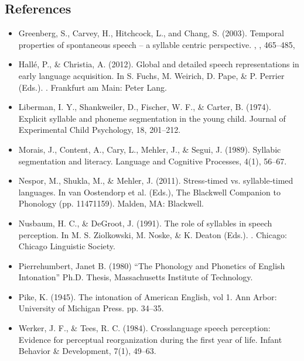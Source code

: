 \documentclass[letterpaper,10pt,english]{jupyterBook}
\begin{document}
\subsection{References}
\label{\detokenize{Introduction/Linguistic_structure_of_speech:references}}\begin{itemize}
\item {} 
\sphinxAtStartPar
Greenberg, S., Carvey, H., Hitchcock, L., and Chang, S. (2003). Temporal properties of spontaneous speech – a syllable centric perspective. , , 465–485,

\item {} 
\sphinxAtStartPar
Hallé, P., \& Christia, A. (2012). Global and detailed speech representations in early language acquisition. In S. Fuchs, M. Weirich, D. Pape, \& P. Perrier (Eds.). . Frankfurt am Main: Peter Lang.

\item {} 
\sphinxAtStartPar
Liberman, I. Y., Shankweiler, D., Fischer, W. F., \& Carter, B. (1974). Explicit syllable and phoneme segmentation in the young child. Journal of Experimental Child Psychology, 18, 201–212.

\item {} 
\sphinxAtStartPar
Morais, J., Content, A., Cary, L., Mehler, J., \& Segui, J. (1989). Syllabic segmentation and literacy. Language and Cognitive Processes, 4(1), 56–67.

\item {} 
\sphinxAtStartPar
Nespor, M., Shukla, M., \& Mehler, J. (2011). Stress‐timed vs. syllable‐timed languages. In van Oostendorp et al. (Eds.), The Blackwell Companion to Phonology (pp. 1147\sphinxhyphen{}1159). Malden, MA: Blackwell.

\item {} 
\sphinxAtStartPar
Nusbaum, H. C., \& DeGroot, J. (1991). The role of syllables in speech perception. In M. S. Ziolkowski, M. Noske, \& K. Deaton (Eds.). . Chicago: Chicago Linguistic Society.

\item {} 
\sphinxAtStartPar
Pierrehumbert, Janet B. (1980) “The Phonology and Phonetics of English Intonation” Ph.D. Thesis, Massachusetts Institute of Technology.

\item {} 
\sphinxAtStartPar
Pike, K. (1945). The intonation of American English, vol 1. Ann Arbor: University of Michigan Press. pp. 34–35.

\item {} 
\sphinxAtStartPar
Werker, J. F., \& Tees, R. C. (1984). Cross\sphinxhyphen{}language speech perception: Evidence for perceptual reorganization during the first year of life. Infant Behavior \& Development, 7(1), 49–63. 

\end{itemize}
\end{document}
